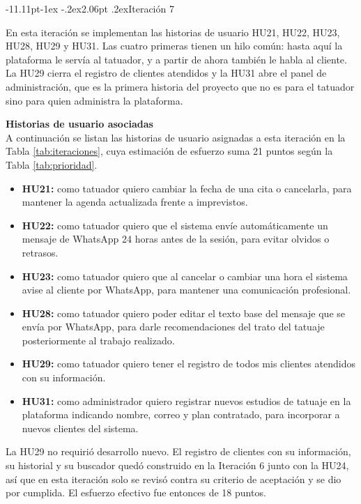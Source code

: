 \documentclass[12pt,letterpaper,oneside]{report}
\makeatletter
\renewcommand\subsection{\@startsection{subsection}{2}{\z@}%
  {-11.11pt\@plus -1ex \@minus -.2ex}{2.06pt \@plus .2ex}{\normalfont\normalsize\bfseries}}
\newcommand{\tituloparpegado}[1]{\par\textbf{#1}\\\indent\ignorespaces}
\makeatother
\begin{document}
\subsection{Iteración 7}

En esta iteración se implementan las historias de usuario HU21, HU22, HU23, HU28, HU29 y HU31. Las cuatro primeras tienen un hilo común: hasta aquí la plataforma le servía al tatuador, y a partir de ahora también le habla al cliente. La HU29 cierra el registro de clientes atendidos y la HU31 abre el panel de administración, que es la primera historia del proyecto que no es para el tatuador sino para quien administra la plataforma.

\vspace{0.3cm}
\tituloparpegado{Historias de usuario asociadas}
A continuación se listan las historias de usuario asignadas a esta iteración en la Tabla \ref{tab:iteraciones}, cuya estimación de esfuerzo suma 21 puntos según la Tabla \ref{tab:prioridad}.

\begin{itemize}
  \item \textbf{HU21:} como tatuador quiero cambiar la fecha de una cita o cancelarla, para mantener la agenda actualizada frente a imprevistos.
  \item \textbf{HU22:} como tatuador quiero que el sistema envíe automáticamente un mensaje de WhatsApp 24 horas antes de la sesión, para evitar olvidos o retrasos.
  \item \textbf{HU23:} como tatuador quiero que al cancelar o cambiar una hora el sistema avise al cliente por WhatsApp, para mantener una comunicación profesional.
  \item \textbf{HU28:} como tatuador quiero poder editar el texto base del mensaje que se envía por WhatsApp, para darle recomendaciones del trato del tatuaje posteriormente al trabajo realizado.
  \item \textbf{HU29:} como tatuador quiero tener el registro de todos mis clientes atendidos con su información.
  \item \textbf{HU31:} como administrador quiero registrar nuevos estudios de tatuaje en la plataforma indicando nombre, correo y plan contratado, para incorporar a nuevos clientes del sistema.
\end{itemize}

La HU29 no requirió desarrollo nuevo. El registro de clientes con su información, su historial y su buscador quedó construido en la Iteración 6 junto con la HU24, así que en esta iteración solo se revisó contra su criterio de aceptación y se dio por cumplida. El esfuerzo efectivo fue entonces de 18 puntos.
\end{document}
